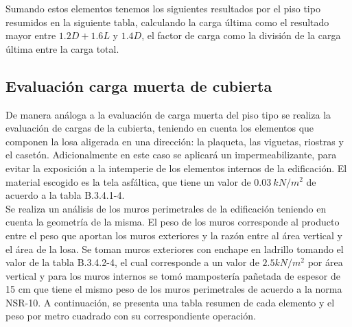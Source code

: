 \documentclass[12pt]{article}
\begin{document}
Sumando estos elementos tenemos los siguientes resultados por el piso tipo resumidos en la siguiente tabla, calculando la carga última como el resultado mayor entre $1.2D+1.6L$ y $1.4D$, el factor de carga como la división de la carga última entre la carga total.




\subsection{Evaluación carga muerta de cubierta}

De manera análoga a la evaluación de carga muerta del piso tipo se realiza la evaluación de cargas de la cubierta, teniendo en cuenta los elementos que componen la losa aligerada en una dirección: la plaqueta, las viguetas, riostras y el casetón. Adicionalmente en este caso se aplicará un impermeabilizante, para evitar la exposición a la intemperie de los elementos internos de la edificación.   El material escogido es la tela asfáltica, que tiene un valor de $0.03\: kN/m^2$ de acuerdo a la tabla B.3.4.1-4.\\

Se realiza un análisis de los muros perimetrales de la edificación teniendo en cuenta la geometría de la misma. El peso de los muros corresponde al producto entre el peso que aportan los muros exteriores y la razón entre al área vertical y el área de la losa. Se toman muros exteriores con enchape en ladrillo tomando el valor de la tabla B.3.4.2-4, el cual corresponde a un valor de $2.5 kN/m^2$ por área vertical y para los muros internos se tomó mampostería pañetada de espesor de 15 cm que tiene el mismo peso de los muros perimetrales de acuerdo a la norma NSR-10. A continuación, se presenta una tabla resumen de cada elemento y el peso por metro cuadrado con su correspondiente operación.
\end{document}

